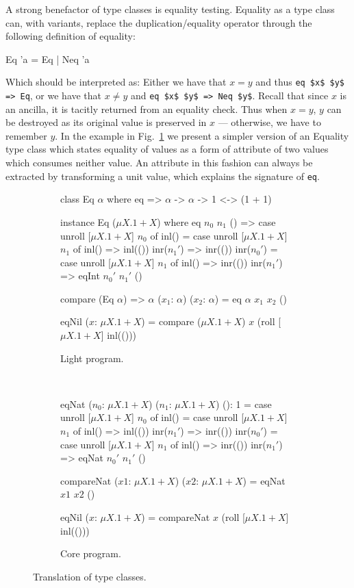 A strong benefactor of type classes is equality testing. Equality as a
type class can, with variants, replace the duplication/equality operator
through the following definition of equality:

\begin{rfuncode}
  Eq 'a = Eq | Neq 'a
\end{rfuncode}

Which should be interpreted as: Either we have that $x = y$ and thus
\lstinline{eq $x$ $y$ => Eq}, or we have that $x \neq y$ and
\lstinline{eq $x$ $y$ => Neq $y$}. Recall that since $x$ is an ancilla, it
is tacitly returned from an equality check.  Thus when $x = y$, $y$ can be
destroyed as its original value is preserved in $x$ --- otherwise, we have to
remember $y$. In the example in Fig.~\ref{fig:type_classes_translation} we
present a simpler version of an Equality type class which states equality of
values as a form of attribute of two values which consumes neither value. An
attribute in this fashion can always be extracted by transforming a unit value,
which explains the signature of \texttt{eq}.

\begin{figure}[ht!]
  \centering
  \begin{subfigure}[b]{0.90\textwidth}
    \begin{rfuncodenum}
class Eq $\alpha$ where
  eq => $\alpha$ -> $\alpha$ -> 1 <-> (1 + 1)

instance Eq ($\mu X . 1 + X$) where
  eq $n_0$ $n_1$ () => case unroll [$\mu X . 1 + X$] $n_0$ of
                   inl() = case unroll [$\mu X . 1 + X$] $n_1$ of
                     inl() => inl(())
                     inr($n_1'$) => inr(())
                   inr($n_0'$) = case unroll [$\mu X . 1 + X$] $n_1$ of
                     inl() => inr(())
                     inr($n_1'$) => eqInt $n_0'$ $n_1'$ ()

compare (Eq $\alpha$) => $\alpha$ ($x_1$: $\alpha$) ($x_2$: $\alpha$) = eq $\alpha$ $x_1$ $x_2$ ()

eqNil ($x$: $\mu X . 1 + X$) = compare ($\mu X . 1 + X$) $x$ (roll [$\mu X . 1 + X$] inl(()))
    \end{rfuncodenum}
    \caption{Light program.}
  \end{subfigure}
  ~
  \begin{subfigure}[b]{0.90\textwidth}
    \begin{rfuncodenum}
eqNat ($n_0$: $\mu X . 1 + X$) ($n_1$: $\mu X . 1 + X$) (): 1 = case unroll [$\mu X . 1 + X$] $n_0$ of
  inl() = case unroll [$\mu X . 1 + X$] $n_1$ of
    inl() => inl(())
    inr($n_1'$) => inr(())
  inr($n_0'$) = case unroll [$\mu X . 1 + X$] $n_1$ of
    inl() => inr(())
    inr($n_1'$) => eqNat $n_0'$ $n_1'$ ()

compareNat ($x1$: $\mu X . 1 + X$) ($x2$: $\mu X . 1 + X$) = eqNat $x1$ $x2$ ()

eqNil ($x$: $\mu X . 1 + X$) = compareNat $x$ (roll [$\mu X . 1 + X$] inl(()))
    \end{rfuncodenum}
    \caption{Core program.}
  \end{subfigure}
  \caption{Translation of type classes.}\label{fig:type_classes_translation}
\end{figure}

